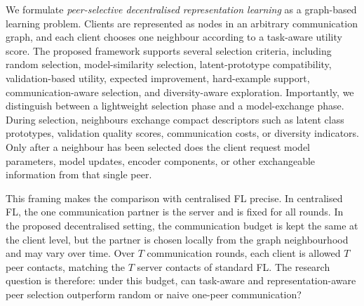 \documentclass[conference]{IEEEtran}
\begin{document}
We formulate \emph{peer-selective decentralised representation learning} as a graph-based learning problem. Clients are represented as nodes in an arbitrary communication graph, and each client chooses one neighbour according to a task-aware utility score. The proposed framework supports several selection criteria, including random selection, model-similarity selection, latent-prototype compatibility, validation-based utility, expected improvement, hard-example support, communication-aware selection, and diversity-aware exploration. Importantly, we distinguish between a lightweight selection phase and a model-exchange phase. During selection, neighbours exchange compact descriptors such as latent class prototypes, validation quality scores, communication costs, or diversity indicators. Only after a neighbour has been selected does the client request model parameters, model updates, encoder components, or other exchangeable information from that single peer.

This framing makes the comparison with centralised FL precise. In centralised FL, the one communication partner is the server and is fixed for all rounds. In the proposed decentralised setting, the communication budget is kept the same at the client level, but the partner is chosen locally from the graph neighbourhood and may vary over time. Over $T$ communication rounds, each client is allowed $T$ peer contacts, matching the $T$ server contacts of standard FL. The research question is therefore: under this budget, can task-aware and representation-aware peer selection outperform random or naive one-peer communication?
\end{document}

